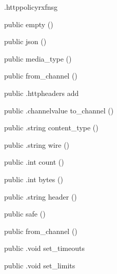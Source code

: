 \begin{CrexxClass}{.httppolicy}{rxfnsg}

  \begin{Hierarchy}
  \end{Hierarchy}

  \begin{Members}

    \Factory
      {public}
      {empty}
      {()}

    \Factory
      {public}
      {json}
      {()}

    \Factory
      {public}
      {media\_type}
      {()}

    \Factory
      {public}
      {from\_channel}
      {()}

    \Method
      {public}
      {.httpheaders}
      {add}
      {}

    \Method
      {public}
      {.channelvalue}
      {to\_channel}
      {()}

    \Method
      {public}
      {.string}
      {content\_type}
      {()}

    \Method
      {public}
      {.string}
      {wire}
      {()}

    \Method
      {public}
      {.int}
      {count}
      {()}

    \Method
      {public}
      {.int}
      {bytes}
      {()}

    \Method
      {public}
      {.string}
      {header}
      {()}

    \Factory
      {public}
      {safe}
      {()}

    \Factory
      {public}
      {from\_channel}
      {()}

    \Method
      {public}
      {.void}
      {set\_timeouts}
      {}

    \Method
      {public}
      {.void}
      {set\_limits}
      {}


\end{Members}
\end{CrexxClass}

